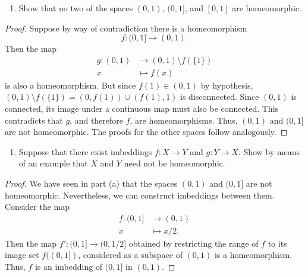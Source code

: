 \begin{solution}
  \begin{enumerate}[label={(\alph*)}, align=left, leftmargin=\parindent, listparindent=\parindent, labelwidth=0pt, itemindent=!]
    \item
      Show that no two of the spaces $(0, 1)$, $(0, 1]$, and $[0, 1]$ are homeomorphic.
  \end{enumerate}
  \begin{proof}
    Suppose by way of contradiction there is a homeomorphism
    \begin{equation*}
      f: (0, 1] \rightarrow (0, 1).
    \end{equation*}
    Then the map
    \begin{align*}
      g: (0, 1) &\rightarrow (0, 1) \setminus f(\{1\}) \\
              x &\mapsto f(x)
    \end{align*}
    is also a homeomorphism.
    But since $f(1) \in (0, 1)$ by hypothesis, $(0, 1) \setminus f(\{1\}) = (0, f(1)) \cup (f(1), 1)$ is disconnected.
    Since $(0, 1)$ is connected, its image under a continuous map must also be connected.
    This contradicts that $g$, and therefore $f$, are homeomorphisms.
    Thus, $(0, 1)$ and $(0, 1]$ are not homeomorphic.
    The proofs for the other spaces follow analogously.
  \end{proof}
  \bigskip

  \begin{enumerate}[label={(\alph*)}, align=left, leftmargin=\parindent, listparindent=\parindent, labelwidth=0pt, itemindent=!]
    \addtocounter{enumi}{1} 
    \item
      Suppose that there exist imbeddings $f: X \rightarrow Y$ and $g: Y \rightarrow X$.
      Show by means of an example that $X$ and $Y$ need not be homeomorphic.
  \end{enumerate}
  \begin{proof}
    We have seen in part (a) that the spaces $(0, 1)$ and $(0, 1]$ are not homeomorphic.
    Nevertheless, we can construct imbeddings between them.
    Consider the map
    \begin{align*}
      f:  (0, 1]  &\rightarrow (0, 1) \\
                x & \mapsto x / 2.
    \end{align*}
    Then the map $f': (0, 1] \rightarrow (0, 1/2]$ obtained by restricting the range of $f$ to its image set $f((0, 1])$, considered as a subspace of $(0, 1)$ is a homeomorphism.
    Thus, $f$ is an imbedding of $(0, 1]$ in $(0, 1)$.


\end{proof}
\end{solution}
